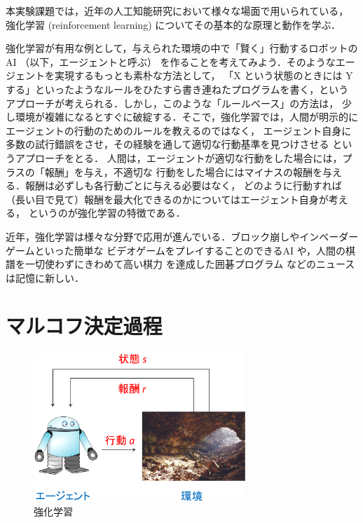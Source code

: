 ﻿



本実験課題では，近年の人工知能研究において様々な場面で用いられている，
強化学習 (reinforcement learning) についてその基本的な原理と動作を学ぶ．

強化学習が有用な例として，与えられた環境の中で「賢く」行動するロボットのAI （以下，エージェントと呼ぶ）
を作ることを考えてみよう．そのようなエージェントを実現するもっとも素朴な方法として，
「X という状態のときには Y する」といったようなルールをひたすら書き連ねたプログラムを書く，という
アプローチが考えられる．しかし，このような「ルールベース」の方法は，
少し環境が複雑になるとすぐに破綻する．そこで，強化学習では，人間が明示的に
エージェントの行動のためのルールを教えるのではなく，
エージェント自身に多数の試行錯誤をさせ，その経験を通して適切な行動基準を見つけさせる
というアプローチをとる．
人間は，エージェントが適切な行動をした場合には，プラスの「報酬」を与え，不適切な
行動をした場合にはマイナスの報酬を与える．報酬は必ずしも各行動ごとに与える必要はなく，
どのように行動すれば（長い目で見て）報酬を最大化できるのかについてはエージェント自身が考える，
というのが強化学習の特徴である．

近年，強化学習は様々な分野で応用が進んでいる．ブロック崩しやインベーダーゲームといった簡単な
ビデオゲームをプレイすることのできるAI \cite{mnih2015humanlevel} や，人間の棋譜を一切使わずにきわめて高い棋力
を達成した囲碁プログラム \cite{silver2017go} などのニュースは記憶に新しい．

\section{マルコフ決定過程}

\begin{figure}[t]
 \begin{center}
  \includegraphics[width=80mm]{images/TsuruokaLab/rl.eps}
 \end{center}
 \caption{強化学習}
 \label{fig:rl1}
\end{figure}

